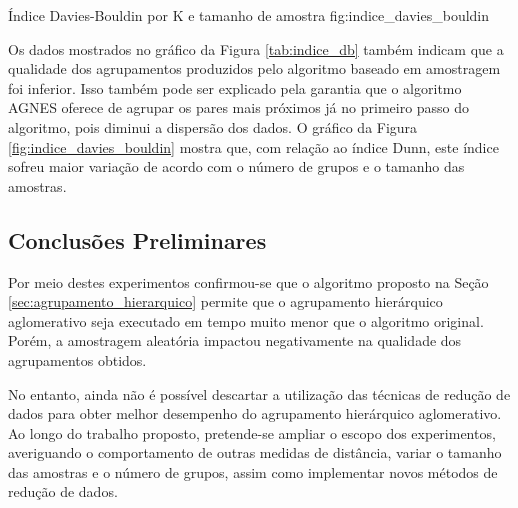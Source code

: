 {Índice Davies-Bouldin por K e tamanho de amostra}
{fig:indice_davies_bouldin}

Os dados mostrados no gráfico da Figura \ref{tab:indice_db} também indicam que a
qualidade dos agrupamentos produzidos pelo algoritmo baseado em amostragem foi
inferior. Isso também pode ser explicado pela garantia que o algoritmo AGNES
oferece de agrupar os pares mais próximos já no primeiro passo do algoritmo,
pois diminui a dispersão dos dados. O gráfico da Figura
\ref{fig:indice_davies_bouldin} mostra que, com relação ao índice Dunn, este
índice sofreu maior variação de acordo com o número de grupos e o tamanho das
amostras.

\subsection{Conclusões Preliminares}
	\label{subsec:conclusoes_preliminares}
	
Por meio destes experimentos confirmou-se que o algoritmo proposto na Seção
\ref{sec:agrupamento_hierarquico} permite que o agrupamento hierárquico
aglomerativo seja executado em tempo muito menor que o algoritmo original.
Porém, a amostragem aleatória impactou negativamente na qualidade dos
agrupamentos obtidos.

No entanto, ainda não é possível descartar a utilização das técnicas de redução
de dados para obter melhor desempenho do agrupamento hierárquico aglomerativo.
Ao longo do trabalho proposto, pretende-se ampliar o escopo dos experimentos,
averiguando o comportamento de outras medidas de distância, variar o tamanho
das amostras e o número de grupos, assim como implementar novos métodos de 
redução de dados.
